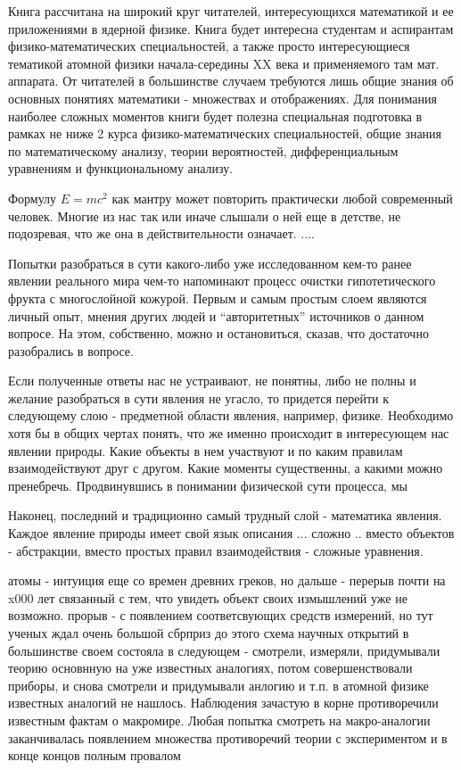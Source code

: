 Книга рассчитана на широкий круг читателей, интересующихся математикой и ее приложениями в ядерной физике. Книга будет интересна студентам и аспирантам физико-математических специальностей, а также просто интересующиеся тематикой атомной физики начала-середины XX века и применяемого там мат. аппарата. От читателей в большинстве случаем требуются лишь общие знания об основных понятиях математики - множествах и отображениях. Для понимания наиболее сложных моментов книги будет полезна специальная подготовка в рамках не ниже 2 курса физико-математических специальностей, общие знания по математическому анализу, теории вероятностей, дифференциальным уравнениям и функциональному анализу.






Формулу $E = mc^2$ как мантру может повторить практически любой современный человек.
Многие из нас так или иначе слышали о ней еще в детстве, не подозревая, что же она в действительности означает.
....


Попытки разобраться в сути какого-либо уже исследованном кем-то ранее явлении реального мира чем-то напоминают процесс очистки гипотетического фрукта с многослойной кожурой.
Первым и самым простым слоем являются личный опыт, мнения других людей и ``авторитетных'' источников о данном вопросе. 
На этом, собственно, можно и остановиться, сказав, что достаточно разобрались в вопросе.

Если полученные ответы нас не устраивают, не понятны, либо не полны и желание разобраться в сути явления не угасло, то придется перейти к следующему слою - предметной области явления, например, физике.
Необходимо хотя бы в общих чертах понять, что же именно происходит в интересующем нас явлении природы. 
Какие объекты в нем участвуют и по каким правилам взаимодействуют друг с другом. Какие моменты существенны, а какими можно пренебречь.
Продвинувшись в понимании физической сути процесса, мы 

Наконец, последний и традиционно самый трудный слой - математика явления.
Каждое явление природы имеет свой язык описания  ...  сложно .. вместо объектов - абстракции, вместо простых правил взаимодействия - сложные уравнения.



атомы - интуиция еще со времен древних греков, но дальше - перерыв почти на x000 лет связанный с тем, что увидеть объект своих измышлений уже не возможно.
прорыв - с появлением соответсвующих средств измерений, но тут ученых ждал очень большой сбрприз
до этого схема научных открытий в большинстве своем состояла в следующем - смотрели, измеряли, придумывали теорию основнную на уже известных аналогиях, потом совершенствовали приборы, и снова смотрели и придумывали анлогию и т.п.
в атомной физике известных аналогий не нашлось. Наблюдения зачастую в корне противоречили известным фактам о макромире. Любая попытка смотреть на макро-аналогии заканчивалась появлением множества противоречий теории с экспериментом и в конце концов полным провалом 


